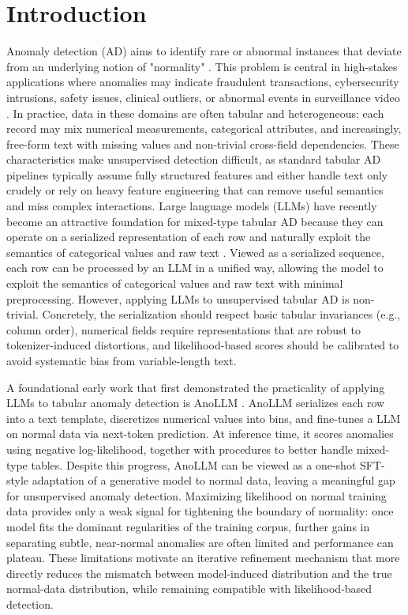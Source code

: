 \section{Introduction}
Anomaly detection (AD) aims to identify rare or abnormal instances that deviate from an underlying notion of "normality" \citep{hawkins1980identification, chandola2009anomaly}. This problem is central in high-stakes applications where anomalies may indicate fraudulent transactions, cybersecurity intrusions, safety issues, clinical outliers, or abnormal events in surveillance video \citep{ngai2011application, buczak2015survey, vu2019robust, fernando2021deep, landauer2023deep}. In practice, data in these domains are often tabular and heterogeneous: each record may mix numerical measurements, categorical attributes, and increasingly, free-form text with missing values and non-trivial cross-field dependencies. These characteristics make unsupervised detection difficult, as standard tabular AD pipelines typically assume fully structured features and either handle text only crudely or rely on heavy feature engineering that can remove useful semantics and miss complex interactions. Large language models (LLMs) have recently become an attractive foundation for mixed-type tabular AD because they can operate on a serialized representation of each row and naturally exploit the semantics of categorical values and raw text \citep{dinh2022lift, hegselmann2023tabllm, fang2024large}. Viewed as a serialized sequence, each row can be processed by an LLM in a unified way, allowing the model to exploit the semantics of categorical values and raw text with minimal preprocessing. However, applying LLMs to unsupervised tabular AD is non-trivial. Concretely, the serialization should respect basic tabular invariances (e.g., column order), numerical fields require representations that are robust to tokenizer-induced distortions, and likelihood-based scores should be calibrated to avoid systematic bias from variable-length text.

A foundational early work that first demonstrated the practicality of applying LLMs to tabular anomaly detection is AnoLLM \citep{tsai2025anollm}. AnoLLM serializes each row into a text template, discretizes numerical values into bins, and fine-tunes a LLM on normal data via next-token prediction. At inference time, it scores anomalies using negative log-likelihood, together with procedures to better handle mixed-type tables. Despite this progress, AnoLLM can be viewed as a one-shot SFT-style adaptation of a generative model to normal data, leaving a meaningful gap for unsupervised anomaly detection. Maximizing likelihood on normal training data provides only a weak signal for tightening the boundary of normality: once model fits the dominant regularities of the training corpus, further gains in separating subtle, near-normal anomalies are often limited and performance can plateau. These limitations motivate an iterative refinement mechanism that more directly reduces the mismatch between model-induced distribution and the true normal-data distribution, while remaining compatible with likelihood-based detection.

